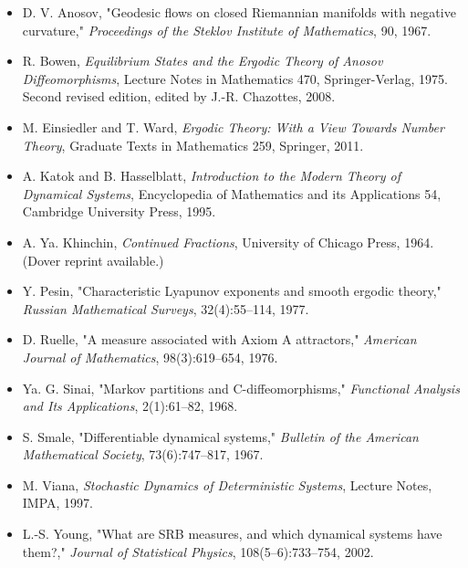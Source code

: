 \begin{itemize}[nosep]
  \item D. V. Anosov, "Geodesic flows on closed Riemannian manifolds with negative curvature," \textit{Proceedings of the Steklov Institute of Mathematics}, 90, 1967.

  \item R. Bowen, \textit{Equilibrium States and the Ergodic Theory of Anosov Diffeomorphisms}, Lecture Notes in Mathematics 470, Springer-Verlag, 1975. Second revised edition, edited by J.-R. Chazottes, 2008.

  \item M. Einsiedler and T. Ward, \textit{Ergodic Theory: With a View Towards Number Theory}, Graduate Texts in Mathematics 259, Springer, 2011.

  \item A. Katok and B. Hasselblatt, \textit{Introduction to the Modern Theory of Dynamical Systems}, Encyclopedia of Mathematics and its Applications 54, Cambridge University Press, 1995.

  \item A. Ya. Khinchin, \textit{Continued Fractions}, University of Chicago Press, 1964. (Dover reprint available.)

  \item Y. Pesin, "Characteristic Lyapunov exponents and smooth ergodic theory," \textit{Russian Mathematical Surveys}, 32(4):55--114, 1977.

  \item D. Ruelle, "A measure associated with Axiom A attractors," \textit{American Journal of Mathematics}, 98(3):619--654, 1976.

  \item Ya. G. Sinai, "Markov partitions and C-diffeomorphisms," \textit{Functional Analysis and Its Applications}, 2(1):61--82, 1968.

  \item S. Smale, "Differentiable dynamical systems," \textit{Bulletin of the American Mathematical Society}, 73(6):747--817, 1967.

  \item M. Viana, \textit{Stochastic Dynamics of Deterministic Systems}, Lecture Notes, IMPA, 1997.

  \item L.-S. Young, "What are SRB measures, and which dynamical systems have them?," \textit{Journal of Statistical Physics}, 108(5--6):733--754, 2002.
\end{itemize}


